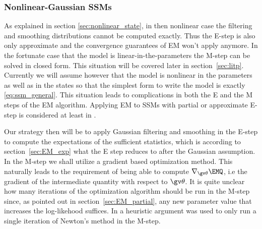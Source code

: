 \subsubsection{Nonlinear-Gaussian SSMs} \label{sec:EM_nonlinear}%

As explained in section \ref{sec:nonlinear_state}, in then nonlinear case
the filtering and smoothing distributions cannot be computed exactly.
Thus the E-step is also only approximate and the convergence
guarantees of EM won't apply anymore. In the fortunate case that the
model is linear-in-the-parameters the M-step can be solved in closed form.
This situation will be covered later in section~\ref{sec:litp}. 
Currently we will assume however that the model is nonlinear in the 
parameters as well as in the states so that the simplest form to write the 
model is exactly \eqref{eq:ssm_general}. This situation leads to 
complications in both the E and the M steps of the EM algorithm.
Applying EM to SSMs with partial or approximate E-step is considered
at least in \textcite{Schon2011,Ratna2008,Doucet2001,Roweis2001,Goodwin2005}.

Our strategy then will be to apply Gaussian filtering and smoothing
in the E-step to compute the expectations of the sufficient statistics,
which is according to section~\ref{sec:EM_exp} what the E step reduces
to after the Gaussian assumption. In the M-step
we shall utilize a gradient based optimization method.
This naturally leads to the requirement of being able to compute 
$\nabla_{\Th}\EMQ$, i.e the gradient of the intermediate quantity with respect
to $\Th$. It is quite unclear how many iterations of the optimization algorithm should
be run in the M-step since, as pointed out in section~\ref{sec:EM_partial},
any new parameter value that increases the log-likehood suffices. In \textcite{Lange1995}
a heuristic argument was used to only run a single iteration of Newton's method in the M-step.


